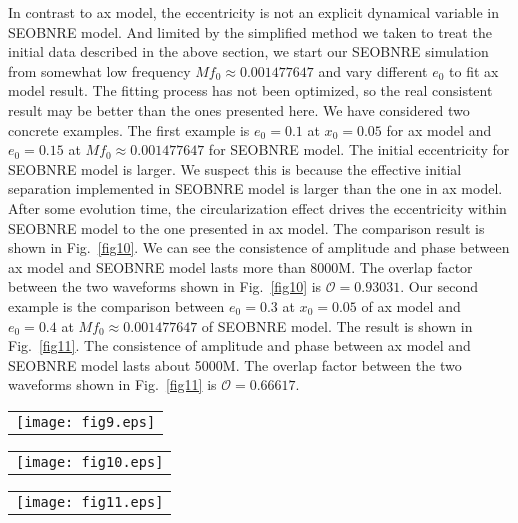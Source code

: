 \documentclass[prd,aps,a4paper,superscriptaddress,twocolumn,footinbib,showpacs]{revtex4}
\begin{document}
In contrast to ax model, the eccentricity is not an explicit dynamical variable in SEOBNRE model. And limited by the simplified method we taken to treat the initial data described in the above section, we start our SEOBNRE simulation from somewhat low frequency $Mf_0\approx0.001477647$ and vary different $e_0$ to fit ax model result. The fitting process has not been optimized, so the real consistent result may be better than the ones presented here. We have considered two concrete examples. The first example is $e_0=0.1$ at $x_0=0.05$ for ax model and $e_0=0.15$ at $Mf_0\approx0.001477647$ for SEOBNRE model. The initial eccentricity for SEOBNRE model is larger. We suspect this is because the effective initial separation implemented in SEOBNRE model is larger than the one in ax model. After some evolution time, the circularization effect drives the eccentricity within SEOBNRE model to the one presented in ax model. The comparison result is shown in Fig.~\ref{fig10}. We can see the consistence of amplitude and phase between ax model and SEOBNRE model lasts more than 8000M. The overlap factor between the two waveforms shown in Fig.~\ref{fig10} is $\mathcal{O}=0.93031$. Our second example is the comparison between $e_0=0.3$ at $x_0=0.05$ of ax model and $e_0=0.4$ at $Mf_0\approx0.001477647$ of SEOBNRE model. The result is shown in Fig.~\ref{fig11}. The consistence of amplitude and phase between ax model and SEOBNRE model lasts about 5000M. The overlap factor between the two waveforms shown in Fig.~\ref{fig11} is $\mathcal{O}=0.66617$.
\begin{figure*}
\begin{tabular}{c}
\texttt{[image: fig9.eps]}
\end{tabular}
\caption{Comparison between ax model and SEOBNRE model for $e_0=0$ case.}\label{fig9}
\end{figure*}

\begin{figure*}
\begin{tabular}{c}
\texttt{[image: fig10.eps]}
\end{tabular}
\caption{Comparison between ax model ($e_0=0.1$, $x_0=0.05$) and SEOBNRE model ($e_0=0.15$, $Mf_0\approx0.001477647$).}\label{fig10}
\end{figure*}

\begin{figure*}
\begin{tabular}{c}
\texttt{[image: fig11.eps]}
\end{tabular}
\caption{Comparison between ax model ($e_0=0.3$, $x_0=0.05$) and SEOBNRE model ($e_0=0.4$, $Mf_0\approx0.001477647$).}\label{fig11}
\end{figure*}
\end{document}
